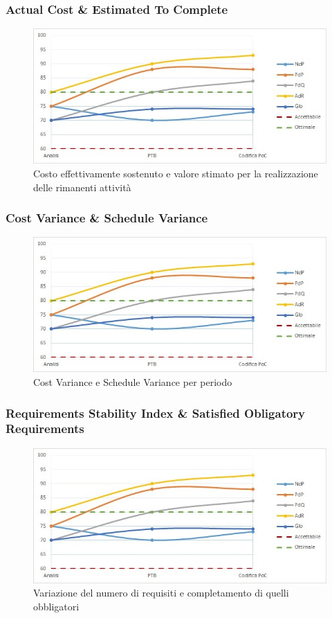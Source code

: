 \subsubsection{Actual Cost \& Estimated To Complete}
\begin{figure}[H]
  \centering
  \includegraphics[scale=0.8]{immagini/gulpease.jpg}
  \caption{Costo effettivamente sostenuto e valore stimato per la realizzazione delle rimanenti attività}
\end{figure}

\subsubsection{Cost Variance \& Schedule Variance}
\begin{figure}[H]
  \centering
  \includegraphics[scale=0.8]{immagini/gulpease.jpg}
  \caption{Cost Variance e Schedule Variance per periodo}
\end{figure}

\subsubsection{Requirements Stability Index \& Satisfied Obligatory Requirements}
\begin{figure}[H]
  \centering
  \includegraphics[scale=0.8]{immagini/gulpease.jpg}
  \caption{Variazione del numero di requisiti e completamento di quelli obbligatori}
\end{figure}

